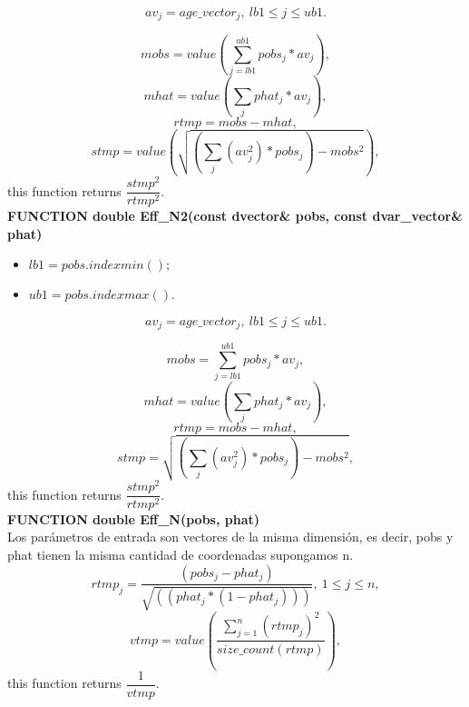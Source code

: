 \documentclass{article}
\begin{document}
\begin{equation}
    av_j = age\_vector_j, \ lb1\leq j \leq ub1.
\end{equation}

\begin{equation}
     mobs = value\left(\sum_{j=lb1}^{ub1}pobs_j*av_j\right),
\end{equation}
\begin{equation}
    mhat = value\left(\sum_{j}phat_j*av_j\right),
\end{equation}
\begin{equation}
    rtmp = mobs-mhat,
\end{equation}
\begin{equation}
    stmp = value\left(\sqrt{\left(\sum_{j}(av_j^2)*pobs_j\right) - mobs^2}\right),
\end{equation}
this function returns $\dfrac{stmp^2}{rtmp^2}$.\\

\textbf{FUNCTION double Eff\_N2(const dvector\& pobs, const dvar\_vector\& phat)}\\
\begin{itemize}
    \item $lb1 = pobs.indexmin();$
    \item $ub1 = pobs.indexmax()$.
\end{itemize}
\begin{equation}
    av_j = age\_vector_j, \ lb1\leq j \leq ub1.
\end{equation}

\begin{equation}
     mobs = \sum_{j=lb1}^{ub1}pobs_j*av_j,
\end{equation}
\begin{equation}
    mhat = value\left(\sum_{j}phat_j*av_j\right),
\end{equation}
\begin{equation}
    rtmp = mobs-mhat,
\end{equation}
\begin{equation}
    stmp = \sqrt{\left(\sum_{j}(av_j^2)*pobs_j\right) - mobs^2},
\end{equation}
this function returns $\dfrac{stmp^2}{rtmp^2}$.\\

\textbf{FUNCTION double Eff\_N(pobs, phat)}\\
Los parámetros de entrada son vectores de la misma dimensión, es decir, pobs y phat tienen la misma cantidad de coordenadas supongamos n.
\begin{equation}
    rtmp_j = \dfrac{(pobs_j-phat_j)}{\sqrt{((phat_j*(1-phat_j)))}},\ 1\leq j \leq n,
\end{equation}
\begin{equation}
    vtmp = value\left(\dfrac{\sum_{j=1}^n(rtmp_j)^2}{size\_count(rtmp)}\right),
\end{equation}
this function returns $\dfrac{1}{vtmp}$.\\
\end{document}
